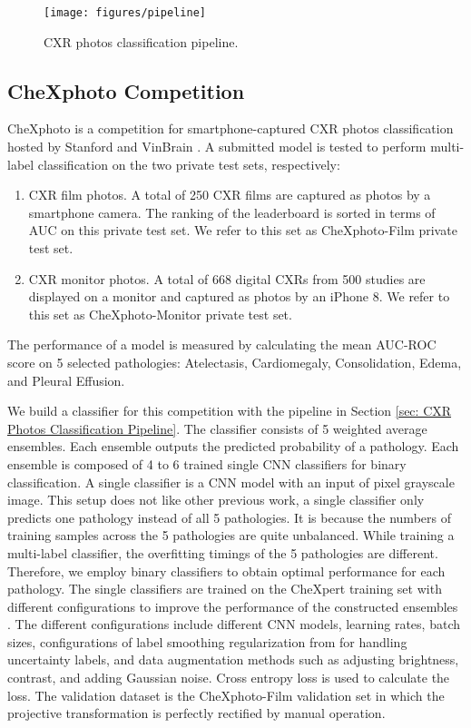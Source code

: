 \documentclass[preprint, 12pt]{elsarticle}
\begin{document}
\begin{figure}
    \centering
    \texttt{[image: figures/pipeline]}
    \caption{CXR photos classification pipeline.}
    \label{fig:pipeline}
\end{figure}

\subsection{CheXphoto Competition} \label{sec:CheXphoto Competition}

CheXphoto is a competition for smartphone-captured CXR photos classification hosted by Stanford and VinBrain \cite{phillips2020chexphoto}. A submitted model is tested to perform multi-label classification on the two private test sets, respectively:
\begin{enumerate}
    \item CXR film photos. A total of 250 CXR films are captured as photos by a smartphone camera. The ranking of the leaderboard is sorted in terms of AUC on this private test set. We refer to this set as CheXphoto-Film private test set.
    \item CXR monitor photos. A total of 668 digital CXRs from 500 studies are displayed on a monitor and captured as photos by an iPhone 8. We refer to this set as CheXphoto-Monitor private test set.
\end{enumerate}
The performance of a model is measured by calculating the mean AUC-ROC score on 5 selected pathologies: Atelectasis, Cardiomegaly, Consolidation, Edema, and Pleural Effusion.

We build a classifier for this competition with the pipeline in Section \ref{sec: CXR Photos Classification Pipeline}. The classifier consists of 5 weighted average ensembles. Each ensemble outputs the predicted probability of a pathology. Each ensemble is composed of 4 to 6 trained single CNN classifiers for binary classification. A single classifier is a CNN model with an input of  pixel grayscale image. This setup does not like other previous work, a single classifier only predicts one pathology instead of all 5 pathologies. It is because the numbers of training samples across the 5 pathologies are quite unbalanced. While training a multi-label classifier, the overfitting timings of the 5 pathologies are different. Therefore, we employ binary classifiers to obtain optimal performance for each pathology. The single classifiers are trained on the CheXpert training set with different configurations to improve the performance of the constructed ensembles \cite{zhou2012ensemble,hansen1990neural}. The different configurations include different CNN models, learning rates, batch sizes, configurations of label smoothing regularization from \cite{pham2021interpreting} for handling uncertainty labels, and data augmentation methods such as adjusting brightness, contrast, and adding Gaussian noise. Cross entropy loss is used to calculate the loss. The validation dataset is the CheXphoto-Film validation set in which the projective transformation is perfectly rectified by manual operation.
\end{document}
